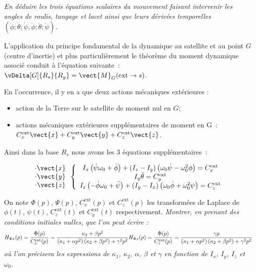 \question{\label{q_8}\label{q_05}}\textit{En déduire les trois équations scalaires du mouvement faisant
  intervenir les angles de roulis, tangage et lacet \triplet{\phi}{\theta}{\psi} ainsi que leurs dérivées temporelles $\left(\dot{\phi};\dot{\theta};\dot{\psi},\ddot{\phi};\ddot{\theta};\ddot{\psi}\right)$.}
\ifprof
\begin{corrige}
L'application du principe fondamental de la dynamique au satellite et au
point $G$ (centre d'inertie) et plus particulièrement le théorème du
moment dynamique associé conduit à l'équation suivante~:
$\vDelta[G]{R_s}{R_g}=\vect{M}_G(\text{ext}\to s)$.

 En l'occurrence, il y en a que deux actions mécaniques extérieures :
\begin{itemize}
\item action de la Terre sur le satellite de moment nul en $G$; 
\item actions mécaniques extérieures supplémentaires de moment en G~: $ C_x^{\text{ext}}\vect{x}+C_y^{\text{ext}}\vect{y}+C_z^{\text{ext}}\vect{z}$.
\end{itemize}

Ainsi dans la base $R_s$ nous avons les 3 équations supplémentaires~:

$$
\begin{array}{c}
\cdot \vect{x}\\
\cdot \vect{y}\\
\cdot \vect{z}\\
\end{array}
\left\{
\begin{array}{c}
I_x\left(\dot{\psi}\omega_0+\ddot{\phi} \right)+\left(I_z-I_y\right)\left(\omega_0\dot{\psi}-\omega_0^2\phi\right)=C_x^{\text{ext}}\\
I_y\ddot{\theta}=C_y^{\text{ext}}\\
I_z\left(-\dot{\phi}\omega_0+\ddot{\psi}\right)
+\left(I_y-I_x \right)\left(\omega_0\dot{\phi}+\omega_0^2\psi\right)=C_z^{\text{ext}}\\
\end{array}
\right.
$$

\end{corrige}
\else
\fi


On note $\Phi(p)$, $\Psi(p)$, $C_x^{\text{ext}}(p)$ et $C_z^{\text{ext}}(p)$ les transformées de Laplace de $\phi(t)$, $\psi(t)$, $C_z^{\text{ext}}(t)$ et $C_y^{\text{ext}}(t)$ respectivement. 
%
\question{\label{q_9}}\textit{Montrer, en prenant des conditions initiales nulles, que l'on peut écrire :}
$$
H_{\Phi x}(p)=\dfrac{\Phi(p)}{C_x^{\text{ext}}(p)}=\dfrac{\kappa_2+\beta p^2}{\left(\kappa_1+\alpha p^2\right)\left(\kappa_2+\beta p^2\right)+\gamma^2p^2}\\
\\
H_{\Phi z}(p)=\dfrac{\Phi(p)}{C_z^{\text{ext}}(p)}=\dfrac{\gamma p}{\left(\kappa_1+\alpha p^2\right)\left(\kappa_2+\beta p^2\right)+\gamma^2p^2}\\
$$
\textit{ où l'on précisera les expressions de $\kappa_1$, $\kappa_2$, $\alpha$, $\beta$ et $\gamma$ en fonction de $I_x$, $I_y$, $I_z$ et $\omega_0$.}

